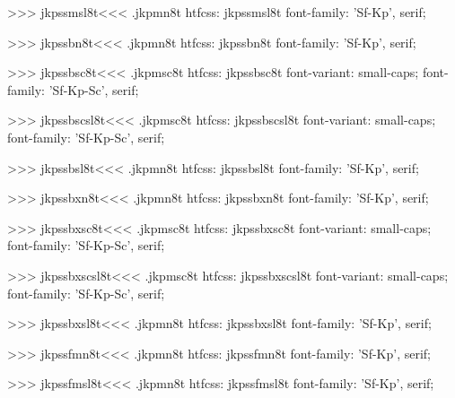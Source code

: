 >>>
\<jkpssmsl8t\><<<
.jkpmn8t
htfcss:  jkpssmsl8t  font-family: 'Sf-Kp', serif;

>>>
\<jkpssbn8t\><<<
.jkpmn8t
htfcss:  jkpssbn8t  font-family: 'Sf-Kp', serif;

>>>
\<jkpssbsc8t\><<<
.jkpmsc8t
htfcss:  jkpssbsc8t  font-variant: small-caps; font-family: 'Sf-Kp-Sc', serif;

>>>
\<jkpssbscsl8t\><<<
.jkpmsc8t
htfcss:  jkpssbscsl8t  font-variant: small-caps; font-family: 'Sf-Kp-Sc', serif;

>>>
\<jkpssbsl8t\><<<
.jkpmn8t
htfcss:  jkpssbsl8t  font-family: 'Sf-Kp', serif;

>>>
\<jkpssbxn8t\><<<
.jkpmn8t
htfcss:  jkpssbxn8t  font-family: 'Sf-Kp', serif;

>>>
\<jkpssbxsc8t\><<<
.jkpmsc8t
htfcss:  jkpssbxsc8t  font-variant: small-caps; font-family: 'Sf-Kp-Sc', serif;

>>>
\<jkpssbxscsl8t\><<<
.jkpmsc8t
htfcss:  jkpssbxscsl8t  font-variant: small-caps; font-family: 'Sf-Kp-Sc', serif;

>>>
\<jkpssbxsl8t\><<<
.jkpmn8t
htfcss:  jkpssbxsl8t  font-family: 'Sf-Kp', serif;

>>>
\<jkpssfmn8t\><<<
.jkpmn8t
htfcss:  jkpssfmn8t  font-family: 'Sf-Kp', serif;

>>>
\<jkpssfmsl8t\><<<
.jkpmn8t
htfcss:  jkpssfmsl8t  font-family: 'Sf-Kp', serif;

